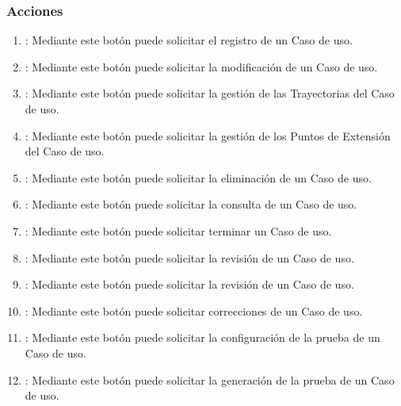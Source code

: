 \subsubsection{Acciones}

\begin{enumerate}
	\item {}: Mediante este botón puede solicitar el registro de un Caso de uso.
	\item {}: Mediante este botón puede solicitar la modificación de un Caso de uso.
	\item {}: Mediante este botón puede solicitar la gestión de las Trayectorias del Caso de uso.
	\item {}: Mediante este botón puede solicitar la gestión de los Puntos de Extensión del Caso de uso.
	\item {}: Mediante este botón puede solicitar la eliminación de un Caso de uso.
	\item {}: Mediante este botón puede solicitar la consulta de un Caso de uso.
	\item {}: Mediante este botón puede solicitar terminar un Caso de uso.
	\item {}: Mediante este botón puede solicitar la revisión de un Caso de uso.
	\item {}: Mediante este botón puede solicitar la revisión de un Caso de uso.
	\item {}: Mediante este botón puede solicitar correcciones de un Caso de uso.
	\item {}: Mediante este botón puede solicitar la configuración de la prueba de un Caso de uso.
	\item {}: Mediante este botón puede solicitar la generación de la prueba de un Caso de uso.
	
	
	
	
	
\end{enumerate}












